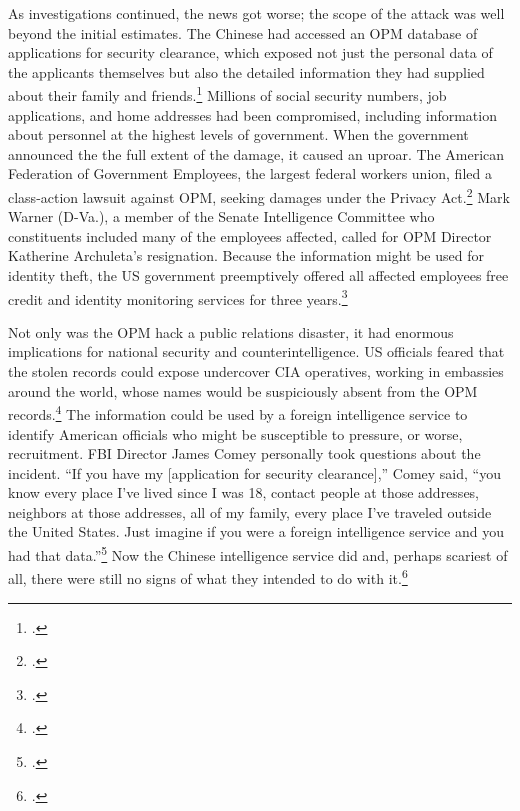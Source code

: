 \documentclass{memoir}
\begin{document}
\begin{refsegment}
As investigations continued, the news got worse; the scope of the attack was well beyond the initial estimates. The Chinese had accessed an OPM database of applications for security clearance, which exposed not just the personal data of the applicants themselves but also the detailed information they had supplied about their family and friends.\footcite{nakashima_hacks_2015} Millions of social security numbers, job applications, and home addresses had been compromised, including information about personnel at the highest levels of government. When the government announced the the full extent of the damage, it caused an uproar. The American Federation of Government Employees, the largest federal workers union, filed a class-action lawsuit against OPM, seeking damages under the Privacy Act.\footcite[The lawsuits were later dismissed.]{chalfant_court_2017} Mark Warner (D-Va.), a member of the Senate Intelligence Committee who constituents included many of the employees affected, called for OPM Director Katherine Archuleta's resignation. Because the information might be used for identity theft, the US government preemptively offered all affected employees free credit and identity monitoring services for three years.\footcite{nakashima_hacks_2015}

Not only was the OPM hack a public relations disaster, it had enormous implications for national security and counterintelligence. US officials feared that the stolen records could expose undercover CIA operatives, working in embassies around the world, whose names would be suspiciously absent from the OPM records.\footcite{nakashima_hacks_2015} The information could be used by a foreign intelligence service to identify American officials who might be susceptible to pressure, or worse, recruitment. FBI Director James Comey personally took questions about the incident. ``If you have my [application for security clearance],'' Comey said, ``you know every place I've lived since I was 18, contact people at those addresses, neighbors at those addresses, all of my family, every place I've traveled outside the United States. Just imagine if you were a foreign intelligence service and you had that data.''\footcite{nakashima_hacks_2015} Now the Chinese intelligence service did and, perhaps scariest of all, there were still no signs of what they intended to do with it.\footcite{koerner_inside_2016}


\end{refsegment}
\end{document}

